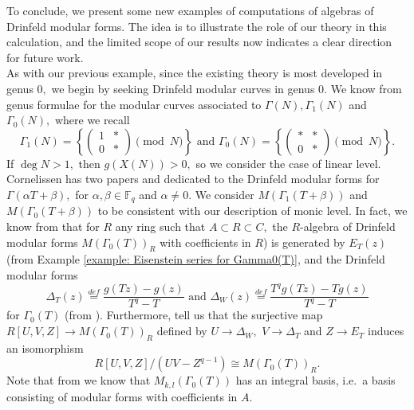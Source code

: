 \documentclass[11pt]{amsart}
\theoremstyle{definition}
\numberwithin{equation}{section}
\newcommand{\bbF}{\mathbb{F}}		%
\begin{document}
To conclude, we present some new examples of computations of algebras of Drinfeld modular forms. The idea is to illustrate the role of our theory in this calculation, and the limited scope of our results now indicates a clear direction for future work.\\     

As with our previous example, since the existing theory is most developed in genus $0,$ we begin by seeking Drinfeld modular curves in genus $0.$ We know from \cite[Theorem $8.1$]{Gekeler-Invariants} genus formulae for the modular curves associated to $\Gamma(N), \Gamma_1(N)$ and $\Gamma_0(N),$ where we recall \[\Gamma_1(N)=\left\{\left(\begin{array}{cc}1&*\\0&*\end{array}\right)\pmod{N}\right\}\text{ and } \Gamma_0(N)=\left\{\left(\begin{array}{cc}*&*\\0&*\end{array}\right)\pmod{N}\right\}.\] If $\deg N>1,$ then $g(X(N))>0,$ so we consider the case of linear level. Cornelissen has two papers \cite{Cornelissen-lvlT} and \cite{Cornelissen-wt1} dedicated to the Drinfeld modular forms for $\Gamma(\alpha T+\beta),$ for $\alpha,\beta\in \bbF_q$ and $\alpha\neq 0.$ We consider
$M(\Gamma_1(T+\beta)) $ and $M(\Gamma_0(T+\beta))$ to be consistent with our description of monic level.
In fact, we know from \cite[Theorem $4.4$]{Dalal-Kumar-Gamma_0(T)-structure} that for $R$ any ring such that $A\subset R\subset C,$ the $R$-algebra of Drinfeld modular forms $M(\Gamma_0(T))_R$ with coefficients in $R$) is generated by $E_T(z)$ (from Example \ref{example: Eisenstein series for Gamma0(T)}, and the Drinfeld modular forms
\[\Delta_T(z)\overset{def}{=}\frac{g(Tz)-g(z)}{T^q-T} \text{ and }\Delta_W(z)\overset{def}{=}\frac{T^qg(Tz)-Tg(z)}{T^q-T}\]
for $\Gamma_0(T)$ (from \cite[Equation $(4.1)$]{Dalal-Kumar-Gamma_0(T)-structure}). Furthermore, \cite[Theorem $4.4$]{Dalal-Kumar-Gamma_0(T)-structure} tell us that the surjective map 
$R[U,V,Z]\to M(\Gamma_0(T))_R$ defined by $U\to \Delta_W,$ $V\to \Delta_T$ and $Z\to E_T$ induces an isomorphism 
\[R[U,V,Z]/(UV-Z^{q-1})\cong M(\Gamma_0(T))_R.\] Note that from \cite[Proposition $4.3(3)$]{Dalal-Kumar-Gamma_0(T)-structure} we know that $M_{k,l}(\Gamma_0(T))$ has an integral basis, i.e.\ a basis consisting of modular forms with coefficients in $A.$\\
\end{document}
